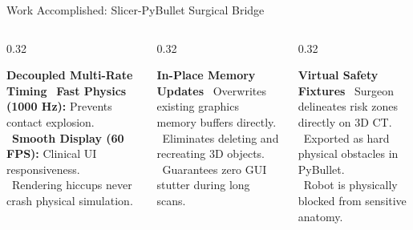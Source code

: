 \documentclass[aspectratio=169, 10pt]{beamer}
\begin{document}
\begin{frame}{Work Accomplished: Slicer-PyBullet Surgical Bridge}

    \vspace{0.25cm}
    \begin{columns}[T]
        \begin{column}{0.32\textwidth}
            \begin{block}{\centering \textbf{Decoupled Multi-Rate Timing}}
                \footnotesize
                \textbullet\ \textbf{Fast Physics (1000 Hz):} Prevents contact explosion.\\
                \textbullet\ \textbf{Smooth Display (60 FPS):} Clinical UI responsiveness.\\
                \textbullet\ Rendering hiccups never crash physical simulation.
            \end{block}
        \end{column}
        \begin{column}{0.32\textwidth}
            \begin{block}{\centering \textbf{In-Place Memory Updates}}
                \footnotesize
                \textbullet\ Overwrites existing graphics memory buffers directly.\\
                \textbullet\ Eliminates deleting and recreating 3D objects.\\
                \textbullet\ Guarantees zero GUI stutter during long scans.
            \end{block}
        \end{column}
        \begin{column}{0.32\textwidth}
            \begin{block}{\centering \textbf{Virtual Safety Fixtures}}
                \footnotesize
                \textbullet\ Surgeon delineates risk zones directly on 3D CT.\\
                \textbullet\ Exported as hard physical obstacles in PyBullet.\\
                \textbullet\ Robot is physically blocked from sensitive anatomy.
            \end{block}
        \end{column}
    \end{columns}
\end{frame}
\end{document}
